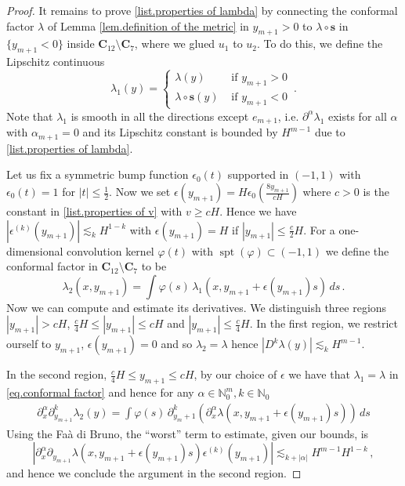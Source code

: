 \documentclass[reqno]{amsart}
\theoremstyle{definition}
\theoremstyle{remark}
\numberwithin{equation}{section}
\newcommand{\N}{\mathbb{N}}
\DeclareMathOperator{\spt}{spt}
\newcommand{\bC}{\mathbf{C}} %
\begin{document}
\begin{proof}
It remains to prove \ref{list.properties of lambda} by connecting the conformal factor $\lambda$ of Lemma \ref{lem.definition of the metric} in $y_{m+1}>0$ to $\lambda\circ \boldsymbol{s}$ in $\{y_{m+1}<0\}$ inside $\bC_{12}\setminus \bC_7$, where we glued $u_1$ to $u_2$. To do this, we define the Lipschitz continuous 
\[ \lambda_1(y) = \begin{cases}
    \lambda(y) &\text{ if } y_{m+1}>0\\
    \lambda \circ \boldsymbol{s}(y) &\text{ if } y_{m+1}<0
\end{cases}\,.\]
Note that $\lambda_1$ is smooth in all the directions except $e_{m+1}$, i.e. $\partial^\alpha\lambda_1$ exists for all $\alpha$ with $\alpha_{m+1}=0$ and its Lipschitz constant is bounded by $H^{m-1}$ due to \ref{list.properties of lambda}. 

Let us fix a symmetric bump function $ \epsilon_0(t)$ supported in $(-1,1)$ with $\epsilon_0 (t)=1$ for $|t|\le \frac12$. Now we set $\epsilon(y_{m+1})= H \epsilon_0( \frac{8y_{m+1}}{cH})$ where $c>0$ is the constant in \eqref{list.properties of v} with $v\ge c H$. Hence we have $|\epsilon^{(k)}(y_{m+1})| \lesssim_k H^{1-k}$ with $\epsilon(y_{m+1})=H$ if $|y_{m+1}|\le \frac{c}{2}H$.  For a one-dimensional convolution kernel $\varphi(t)$ with $\spt(\varphi)\subset (-1,1)$ we define the conformal factor in $\bC_{12}\setminus \bC_7$ to  be 
\begin{equation}\label{eq.conformal factor}
    \lambda_2(x,y_{m+1})= \int \varphi(s)\, \lambda_1(x,y_{m+1} + \epsilon(y_{m+1})s)\,ds\,.
\end{equation}
Now we can compute and estimate its derivatives.
We distinguish three regions $|y_{m+1}|>cH$, $\frac{c}{4} H \le |y_{m+1}| \le cH$ and $|y_{m+1}| \le \frac{c}{4}H$.
In the first region, we restrict ourself to $y_{m+1}$, $\epsilon(y_{m+1})=0$ and so $\lambda_2=\lambda$ hence $|D^k\lambda(y)|\lesssim_k H^{m-1}$.

In the second region, $\frac{c}{4} H \le y_{m+1} \le c H$, by our choice of $\epsilon$ we have that $\lambda_1=\lambda$ in \eqref{eq.conformal factor} and hence for any $\alpha\in \N_0^m, k\in \N_0$ 
\begin{align*}
    \partial_x^\alpha \partial_{y_{m+1}}^k\lambda_2(y) = \int \varphi(s)\, \partial_{y_m+1}^k \left( \partial_x^\alpha\lambda(x,y_{m+1} + \epsilon(y_{m+1})s)\right)\, ds 
\end{align*}
Using the  Fa\`a di Bruno, the ``worst'' term to estimate, given our bounds, is
\[
|\partial_x^\alpha\partial_{y_{m+1}}\lambda(x,y_{m+1} + \epsilon(y_{m+1})s)\epsilon^{(k)}(y_{m+1})|\lesssim_{k+|\alpha|} H^{m-1} H^{1-k}\, ,
\]
and hence we conclude  the argument in the second region.


\end{proof}
\end{document}
